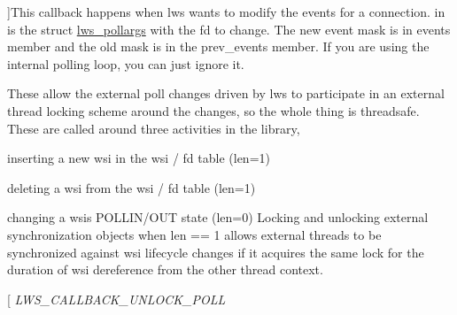 \begin{Desc}
\begin{description}
{}]This callback happens when lws wants to modify the events for a connection. in is the struct \hyperlink{structlws__pollargs}{lws\+\_\+pollargs} with the fd to change. The new event mask is in events member and the old mask is in the prev\+\_\+events member. If you are using the internal polling loop, you can just ignore it. \item[{\em 
L\+W\+S\+\_\+\+C\+A\+L\+L\+B\+A\+C\+K\+\_\+\+L\+O\+C\+K\+\_\+\+P\+O\+LL\hypertarget{group__usercb_ggad62860e19975ba4c4af401c3cdb6abf7a8909732521d379179003d97ab7a05428}{}\label{group__usercb_ggad62860e19975ba4c4af401c3cdb6abf7a8909732521d379179003d97ab7a05428}
}]These allow the external poll changes driven by lws to participate in an external thread locking scheme around the changes, so the whole thing is threadsafe. These are called around three activities in the library,
\begin{DoxyItemize}
\item inserting a new wsi in the wsi / fd table (len=1)
\item deleting a wsi from the wsi / fd table (len=1)
\item changing a wsi\textquotesingle{}s P\+O\+L\+L\+I\+N/\+O\+UT state (len=0) Locking and unlocking external synchronization objects when len == 1 allows external threads to be synchronized against wsi lifecycle changes if it acquires the same lock for the duration of wsi dereference from the other thread context. 
\end{DoxyItemize}\item[{\em 
L\+W\+S\+\_\+\+C\+A\+L\+L\+B\+A\+C\+K\+\_\+\+U\+N\+L\+O\+C\+K\+\_\+\+P\+O\+LL\hypertarget{group__usercb_ggad62860e19975ba4c4af401c3cdb6abf7a0e9e3dd667c0c42cdbe1a3d921f4fd79}{}\label{group__usercb_ggad62860e19975ba4c4af401c3cdb6abf7a0e9e3dd667c0c42cdbe1a3d921f4fd79}
}
\end{description}
\end{Desc}
